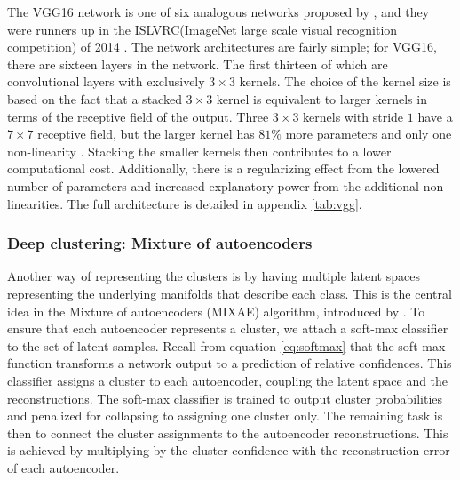 \documentclass[preprint,12pt]{elsarticle}
\begin{document}
The VGG16 network is one of six analogous networks proposed by \citet{Simonyan2014}, and they were runners up in the ISLVRC(ImageNet large scale visual recognition competition) of 2014 \cite{Russakovsky2015}. The network architectures are fairly simple; for VGG16, there are sixteen layers in the network. The first thirteen of which are convolutional layers with exclusively $3 \times 3$ kernels. The choice of the kernel size is based on the fact that a stacked $3 \times 3$ kernel is equivalent to larger kernels in terms of the receptive field of the output. Three $3 \times 3$ kernels with stride $1$ have a $7 \times 7$ receptive field, but the larger kernel has $81\%$ more parameters and only one non-linearity \cite{Simonyan2014}. Stacking the smaller kernels then contributes to a lower computational cost. Additionally, there is a regularizing effect from the lowered number of parameters and increased explanatory power from the additional non-linearities. The full architecture is detailed in appendix \ref{tab:vgg}.


\subsubsection{Deep clustering: Mixture of autoencoders}\label{sec:mixae}

Another way of representing the clusters is by having multiple latent spaces representing the underlying manifolds that describe each class. This is the central idea in the Mixture of autoencoders (MIXAE) algorithm, introduced by  \cite{Zhang}. To ensure that each autoencoder represents a cluster, we attach a soft-max classifier to the set of latent samples. Recall from equation \ref{eq:softmax} that the soft-max function transforms a network output to a prediction of relative confidences. This classifier assigns a cluster to each autoencoder, coupling the latent space and the reconstructions. The soft-max classifier is trained to output cluster probabilities and penalized for collapsing to assigning one cluster only. The remaining task is then to connect the cluster assignments to the autoencoder reconstructions. This is achieved by multiplying by the cluster confidence with the reconstruction error of each autoencoder.
\end{document}
